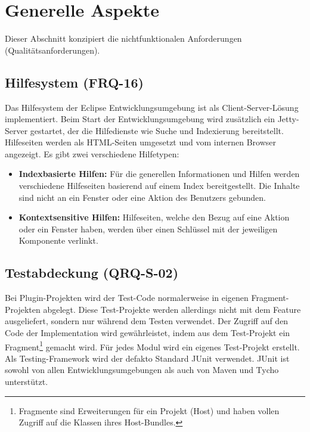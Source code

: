 \chapter{Generelle Aspekte}
Dieser Abschnitt konzipiert die nichtfunktionalen Anforderungen (Qualitätsanforderungen).

\section{Hilfesystem (FRQ-16)}\label{hilfesystem}
Das Hilfesystem der Eclipse Entwicklungsumgebung ist als Client-Server-Lösung implementiert. Beim Start der Entwicklungsumgebung wird zusätzlich ein Jetty-Server gestartet, der die Hilfedienste wie Suche und Indexierung bereitstellt.  Hilfeseiten werden als HTML-Seiten umgesetzt und vom internen Browser angezeigt. Es gibt zwei verschiedene Hilfetypen:


\begin{itemize}
\item \textbf{Indexbasierte Hilfen:} Für die generellen Informationen und Hilfen werden verschiedene Hilfeseiten basierend auf einem Index bereitgestellt. Die Inhalte sind nicht an ein Fenster oder eine Aktion des Benutzers gebunden. 
\item \textbf{Kontextsensitive Hilfen:} Hilfeseiten, welche den Bezug auf eine Aktion oder ein Fenster haben, werden über einen Schlüssel mit der jeweiligen Komponente verlinkt.
\end{itemize}

\section{Testabdeckung (QRQ-S-02)}\label{testing}
Bei Plugin-Projekten wird der Test-Code normalerweise in eigenen Fragment-Projekten abgelegt. Diese Test-Projekte werden allerdings nicht mit dem Feature ausgeliefert, sondern nur während dem Testen verwendet. Der Zugriff auf den Code der Implementation wird gewährleistet, indem aus dem Test-Projekt ein Fragment\footnote{Fragmente sind Erweiterungen für ein Projekt (Host) und haben vollen Zugriff auf die Klassen ihres Host-Bundles.} gemacht wird. Für jedes Modul wird ein eigenes Test-Projekt erstellt. Als Testing-Framework wird der defakto Standard JUnit verwendet. JUnit ist sowohl von allen Entwicklungsumgebungen als auch von Maven und Tycho unterstützt.

